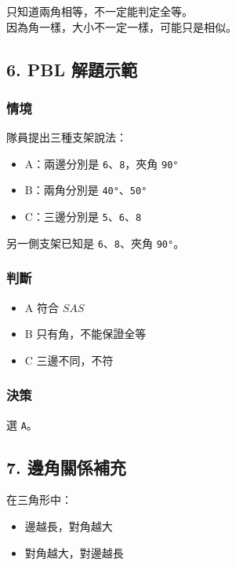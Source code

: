 \documentclass[
  chinese,
  12pt,
  a4paper,
  oneside]{article}
\providecommand{\tightlist}{%
  \setlength{\itemsep}{0pt}\setlength{\parskip}{0pt}}
\begin{document}
只知道兩角相等，不一定能判定全等。\\
因為角一樣，大小不一定一樣，可能只是相似。

\subsection{6. PBL 解題示範}\label{pbl-ux89e3ux984cux793aux7bc4-3}

\subsubsection{情境}\label{ux60c5ux5883-4}

隊員提出三種支架說法：

\begin{itemize}
\tightlist
\item
  A：兩邊分別是 \texttt{6}、\texttt{8}，夾角 \texttt{90°}
\item
  B：兩角分別是 \texttt{40°}、\texttt{50°}
\item
  C：三邊分別是 \texttt{5}、\texttt{6}、\texttt{8}
\end{itemize}

另一側支架已知是 \texttt{6}、\texttt{8}、夾角 \texttt{90°}。

\subsubsection{判斷}\label{ux5224ux65b7-4}

\begin{itemize}
\tightlist
\item
  A 符合 \(SAS\)
\item
  B 只有角，不能保證全等
\item
  C 三邊不同，不符
\end{itemize}

\subsubsection{決策}\label{ux6c7aux7b56-4}

選 \texttt{A}。

\subsection{7. 邊角關係補充}\label{ux908aux89d2ux95dcux4fc2ux88dcux5145}

在三角形中：

\begin{itemize}
\tightlist
\item
  邊越長，對角越大
\item
  對角越大，對邊越長
\end{itemize}
\end{document}
